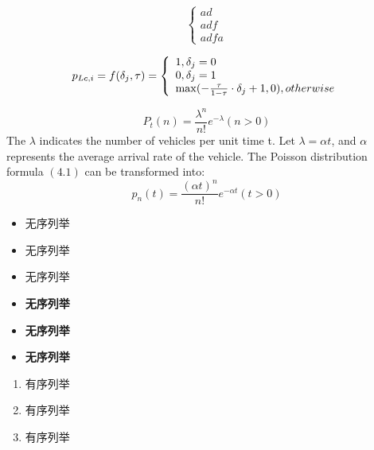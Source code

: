\[\left\{ \begin{array}{l}
		ad  \\
		adf \\
		adfa
	\end{array} \right.\]

\begin{equation}
	{p_{Lc,i}} = f({\delta _j},\tau ) = \left\{ \begin{array}{l}
		1    ,{\delta _j} = 0 \\
		0   , {\delta _j} = 1 \\
		\max ( - \frac{\tau }{{1 - \tau }} \cdot {\delta _j} + 1,0){\rm{     }},otherwise{\rm{ }}
	\end{array} \right.
\end{equation}


\begin{equation}
	{P_t}(n) = \frac{{{\lambda ^n}}}{{n!}}{e^{ - \lambda }}(n > 0)
\end{equation}
The $\lambda$ indicates the number of vehicles per unit time t. Let $ \lambda = \alpha t $, and $\alpha$ represents the average arrival rate of the vehicle. The Poisson distribution formula $(4.1)$ can be transformed into:
\begin{equation}
	{p_n}(t) = \frac{{{{(\alpha t)}^n}}}{{n!}}{e^{ - \alpha t}}(t > 0)
\end{equation}

\begin{itemize}
	\item  无序列举
	\item  无序列举
	\item  无序列举
\end{itemize}


\begin{itemize}
	\item \textbf{无序列举}
	\item \textbf{无序列举}
	\item \textbf{无序列举}
\end{itemize}

\begin{enumerate}
	\item  有序列举
	\item  有序列举
	\item  有序列举
\end{enumerate}
























